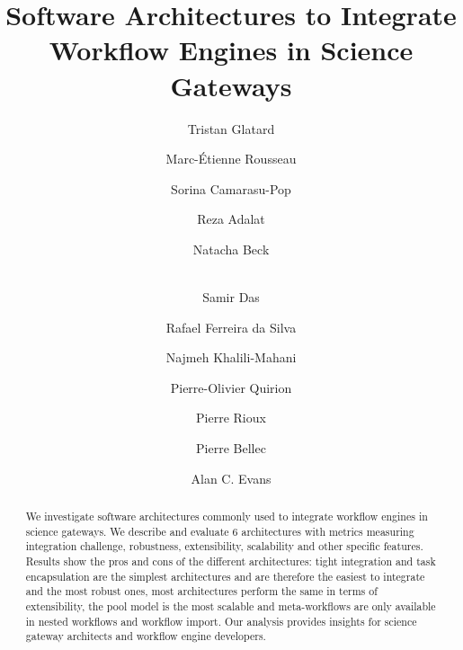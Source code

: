 \documentclass[preprint,3p,twocolumn]{elsarticle}
\begin{document}
\begin{frontmatter}



\title{Software Architectures to Integrate Workflow Engines in Science Gateways}


\author[mcgill,creatis]{Tristan Glatard}
\author[mcgill]{Marc-\'Etienne Rousseau}
\author[creatis]{Sorina Camarasu-Pop}

\author[mcgill]{Reza Adalat}
\author[mcgill]{Natacha Beck}
\author[mcgill]{\\Samir Das}
\author[isi]{Rafael Ferreira da Silva}
\author[mcgill]{Najmeh Khalili-Mahani}
\author[criugm]{Pierre-Olivier Quirion}
\author[mcgill]{Pierre Rioux}

\author[criugm]{Pierre Bellec}
\author[mcgill]{Alan C. Evans}

\address[mcgill]{McGill Centre for Integrative Neuroscience, Montreal Neurological Institute, McGill University, Canada.}
\address[creatis]{University of Lyon, CNRS, INSERM, CREATIS, Villeurbanne, France.}
\address[criugm]{Centre de Recherche de l'Institut de G\'eriatrie de Montr\'eal CRIUGM, Montr\'eal, QC, Canada.}
\address[isi]{University of Southern California, Information Sciences Institute, Marina del Rey, CA, USA.}

\begin{abstract}
  We investigate software architectures commonly used to integrate
  workflow engines in science gateways. We describe and evaluate 6
  architectures with metrics measuring integration challenge,
  robustness, extensibility, scalability and other specific
  features. Results show the pros and cons of the different
  architectures: tight integration and task encapsulation are the
  simplest architectures and are therefore the easiest to integrate
  and the most robust ones, most architectures perform the same in
  terms of extensibility, the pool model is the most scalable and
  meta-workflows are only available in nested workflows and workflow
  import. Our analysis provides insights for science gateway
  architects and workflow engine developers.
\end{abstract}


\end{frontmatter}
\end{document}
